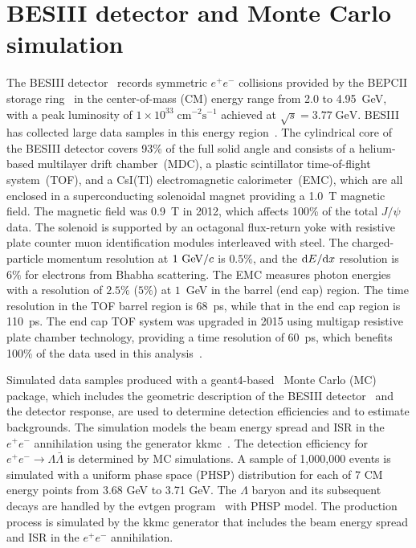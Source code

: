 \documentclass[a4paper,11pt]{article}
\begin{document}
\section{BESIII detector and Monte Carlo simulation}
The BESIII detector~\cite{Ablikim:2009aa} records symmetric $e^+e^-$ collisions 
provided by the BEPCII storage ring~\cite{Yu:IPAC2016-TUYA01}
in the center-of-mass (CM) energy range from 2.0 to {4.95~GeV},
with a peak luminosity of $1 \times 10^{33}\;\text{cm}^{-2}\text{s}^{-1}$ 
achieved at $\sqrt{s} = 3.77\;\text{GeV}$. 
BESIII has collected large data samples in this energy region~\cite{Ablikim:2019hff}. The cylindrical core of the BESIII detector covers 93\% of the full solid angle and consists of a helium-based
 multilayer drift chamber~(MDC), a plastic scintillator time-of-flight
system~(TOF), and a CsI(Tl) electromagnetic calorimeter~(EMC),
which are all enclosed in a superconducting solenoidal magnet
providing a 1.0~T magnetic field.
{
The magnetic field was 0.9~T in 2012, which affects 100\% of the total $J/\psi$ data.}
The solenoid is supported by an
octagonal flux-return yoke with resistive plate counter muon
identification modules interleaved with steel. 
The charged-particle momentum resolution at $1~{\rm GeV}/c$ is
$0.5\%$, and the 
${\rm d}E/{\rm d}x$
resolution is $6\%$ for electrons
from Bhabha scattering. The EMC measures photon energies with a
resolution of $2.5\%$ ($5\%$) at $1$~GeV in the barrel (end cap)
region. The time resolution in the TOF barrel region is 68~ps, while
that in the end cap region is 110~ps. {The end cap TOF
system was upgraded in 2015 using multigap resistive plate chamber
technology, providing a time resolution of
60~ps,
which benefits 100\% of the data used in this analysis~\cite{etof1,etof2,etof3}.}

Simulated data samples produced with a {\sc geant4}-based~\cite{GEANT4} Monte Carlo (MC) package, which includes the geometric description of the BESIII detector~\cite{Huang:2022wuo} and the detector response, are used to determine detection efficiencies and to estimate backgrounds. The simulation models the beam energy spread and ISR in the $e^+e^-$ annihilation using the generator {\sc kkmc}~\cite{KKMC}.
The detection efficiency for $e^+e^-\to\Lambda\bar\Lambda$ is determined by MC simulations. A sample of 1,000,000 events is simulated with a uniform phase space (PHSP) distribution for each of 7 CM energy points from 3.68 GeV to 3.71 GeV.
The $\Lambda$ baryon and its subsequent decays are handled by the {\sc evtgen} program~\cite{evtgen2,EVTGEN} with PHSP model. 
The production process is simulated by the {\sc kkmc} generator that includes the beam energy spread and ISR\cite{continuum} in the $e^+e^-$ annihilation.
\end{document}
